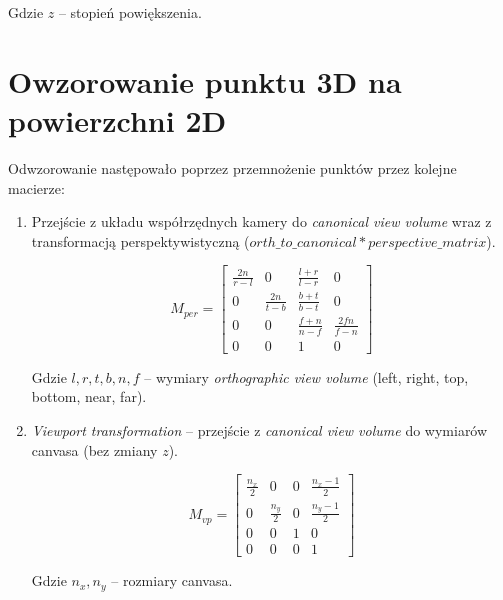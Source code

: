 \documentclass{article}
\begin{document}
        Gdzie \(z\) -- stopień powiększenia.

\newpage

\section{Owzorowanie punktu 3D na powierzchni 2D}

    Odwzorowanie następowało poprzez przemnożenie punktów przez kolejne macierze:

    \begin{enumerate}

        \item Przejście z układu współrzędnych kamery do \textit{canonical view volume} wraz 
        z transformacją perspektywistyczną (\(orth\_to\_canonical * perspective\_matrix\)).

        \begin{equation}
            M_{per}=
            \begin{bmatrix}
                \frac{2n}{r-l} & 0 & \frac{l+r}{l-r} & 0 \\
                0 & \frac{2n}{t-b} & \frac{b+t}{b-t} & 0 \\
                0 & 0 & \frac{f+n}{n-f} & \frac{2fn}{f-n} \\
                0 & 0 & 1 & 0
            \end{bmatrix}
        \end{equation}

        Gdzie \(l, r, t, b, n, f\) -- wymiary \textit{orthographic view volume} (left, right,
        top, bottom, near, far).

        \item \textit{Viewport transformation} -- przejście z \textit{canonical view volume}
        do wymiarów canvasa (bez zmiany \(z\)).

        \begin{equation}
            M_{vp}=
            \begin{bmatrix}
                \frac{n_x}{2} & 0 & 0 & \frac{n_x-1}{2} \\
                0 & \frac{n_y}{2} & 0 & \frac{n_y-1}{2} \\
                0 & 0 & 1 & 0 \\
                0 & 0 & 0 & 1
            \end{bmatrix}
        \end{equation}

        Gdzie \(n_x, n_y\) -- rozmiary canvasa.

    \end{enumerate}
\end{document}

